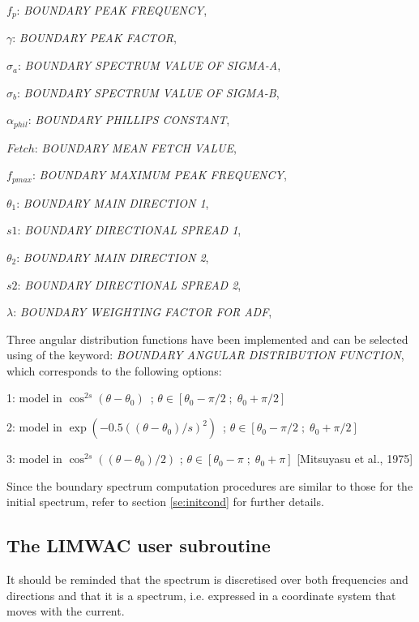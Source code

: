  $f_p$:  \textit{BOUNDARY PEAK FREQUENCY},

 $\gamma$:  \textit{BOUNDARY PEAK FACTOR},

 $\sigma_a$:  \textit{BOUNDARY SPECTRUM VALUE OF SIGMA-A},

 $\sigma_b$:  \textit{BOUNDARY SPECTRUM VALUE OF SIGMA-B},

 $\alpha_{phil}$:  \textit{BOUNDARY PHILLIPS CONSTANT},

 $Fetch$:  \textit{BOUNDARY MEAN FETCH VALUE},

 $f_{pmax}$:  \textit{BOUNDARY MAXIMUM PEAK FREQUENCY},

 $\theta_1$:  \textit{BOUNDARY MAIN DIRECTION 1},

 $s1$:  \textit{BOUNDARY DIRECTIONAL SPREAD 1},

 $\theta_2$:  \textit{BOUNDARY MAIN DIRECTION 2},

 $s2$:  \textit{BOUNDARY DIRECTIONAL SPREAD 2},

 $\lambda$:  \textit{BOUNDARY WEIGHTING FACTOR FOR ADF},

 Three angular distribution functions have been implemented and can be selected using of the keyword: \textit{BOUNDARY ANGULAR DISTRIBUTION FUNCTION}, which corresponds to the following options:

 1:  model in $\cos ^{2s} (\theta -\theta _{0} )$~; $\theta \in \left[\theta _{0} -\pi /2\; ;\; \theta _{0} +\pi /2\right]$

 2:  model in $\exp \left(-0.5\left(\left(\theta -\theta _{0} \right)/s\right)^{2} \right)$~; $\theta \in \left[\theta _{0} -\pi /2\; ;\; \theta _{0} +\pi /2\right]$

 3:  model in $\cos ^{2s} \left(\left(\theta -\theta _{0} \right)/2\right)$ ; $\theta \in \left[\theta _{0} -\pi \; ;\; \theta _{0} +\pi \right]$ [Mitsuyasu et al., 1975]

 Since the boundary spectrum computation procedures are similar to those for the initial spectrum, refer to section \ref{se:initcond} for further details.

\subsection{ The LIMWAC user subroutine}

 It should be reminded that the spectrum is discretised over both frequencies and directions and that it is a  spectrum, i.e. expressed in a coordinate system that moves with the current.

